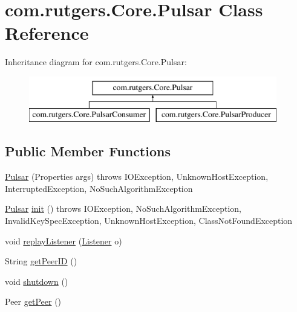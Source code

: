 \hypertarget{classcom_1_1rutgers_1_1Core_1_1Pulsar}{}\section{com.\+rutgers.\+Core.\+Pulsar Class Reference}
\label{classcom_1_1rutgers_1_1Core_1_1Pulsar}
Inheritance diagram for com.\+rutgers.\+Core.\+Pulsar\+:\begin{figure}[H]
\begin{center}
\leavevmode
\includegraphics[height=2.000000cm]{classcom_1_1rutgers_1_1Core_1_1Pulsar}
\end{center}
\end{figure}
\subsection*{Public Member Functions}
\begin{DoxyCompactItemize}
\item 
\hyperlink{classcom_1_1rutgers_1_1Core_1_1Pulsar_a520ae30ea4c17bc8456287680348026e}{Pulsar} (Properties args)  throws I\+O\+Exception, Unknown\+Host\+Exception, Interrupted\+Exception, No\+Such\+Algorithm\+Exception 
\item 
\hyperlink{classcom_1_1rutgers_1_1Core_1_1Pulsar}{Pulsar} \hyperlink{classcom_1_1rutgers_1_1Core_1_1Pulsar_a9f6823c241f896bc76726e3d3faa43a7}{init} ()  throws I\+O\+Exception, No\+Such\+Algorithm\+Exception, Invalid\+Key\+Spec\+Exception, Unknown\+Host\+Exception, Class\+Not\+Found\+Exception 
\item 
void \hyperlink{classcom_1_1rutgers_1_1Core_1_1Pulsar_a951e085f4728c49aff0b41c5821edf6d}{replay\+Listener} (\hyperlink{interfacecom_1_1rutgers_1_1Core_1_1Listener}{Listener} o)
\item 
String \hyperlink{classcom_1_1rutgers_1_1Core_1_1Pulsar_a93cdb03ff77f49499e38aeccdb47902d}{get\+Peer\+ID} ()
\item 
void \hyperlink{classcom_1_1rutgers_1_1Core_1_1Pulsar_a76949c362c6b9fa28f1475cc3ae04123}{shutdown} ()
\item 
Peer \hyperlink{classcom_1_1rutgers_1_1Core_1_1Pulsar_af658475144e81b39e554b8ed21a19bdb}{get\+Peer} ()
\end{DoxyCompactItemize}


